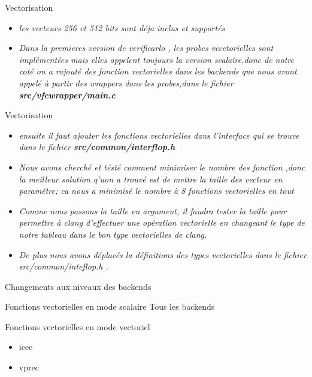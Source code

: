 \documentclass{beamer}
\begin{document}
\begin{frame}{Vectorisation}         

  \begin{itemize}
   \item\textit{les vecteurs 256 et 512 bits sont déja inclus et supportés} 
   \item\textit{Dans la premieres version de verificarlo , les probes vecctorielles sont implémentées mais elles appelent toujours la version scalaire.donc de notre coté on a rajouté des fonction vectorielles dans les backends que nous avont appelé à partir des wrappers dans les probes,dans le fichier \textbf{src/vfcwrapper/main.c} } 
   \end{itemize}
\end{frame}

\begin{frame}{Vectorisation}         

  \begin{itemize}
  \item\textit{ensuite il faut ajouter les fonctions vectorielles dans l'interface qui se trouve dans le fichier \textbf{src/common/interflop.h}} 
 \item\textit{Nous avons cherché et tésté comment minimiser le nombre des fonction ,donc la meilleur solution q'uon a trouvé est de mettre la taille des vecteur en paramétre; ca nous a minimisé le nombre à 8 fonctions vectorielles en tout}
 \item\textit{Comme nous passons la taille en argument, il faudra tester la taille pour permettre à clang d’effectuer une opération vectorielle en changeant le type de notre tableau dans le bon type vectorielles de clang.}
 
 \item\textit{De plus nous avons déplacés la définitions des types vectorielles dans le fichier src/common/inteflop.h .}
   \end{itemize}
\end{frame}
\begin{frame}{Changements aux niveaux des backends}

  \begin{block}{Fonctions vectorielles en mode scalaire}
    Tous les backends
  \end{block}

  \begin{block}{Fonctions vectorielles en mode vectoriel}
    \begin{itemize}
    \item ieee
    \item vprec
    \end{itemize}
  \end{block}

\end{frame}
\end{document}
